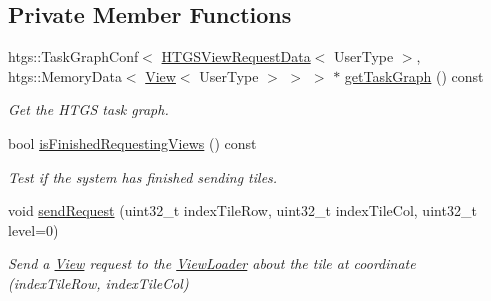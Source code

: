 \subsection*{Private Member Functions}
\begin{DoxyCompactItemize}
\item 
htgs\+::\+Task\+Graph\+Conf$<$ \hyperlink{classfi_1_1HTGSViewRequestData}{H\+T\+G\+S\+View\+Request\+Data}$<$ User\+Type $>$, htgs\+::\+Memory\+Data$<$ \hyperlink{classfi_1_1View}{View}$<$ User\+Type $>$ $>$ $>$ $\ast$ \hyperlink{classfi_1_1FastImage_a81ec16682f029e8d7f64888c6212066b}{get\+Task\+Graph} () const
\begin{DoxyCompactList}\small\item\em Get the H\+T\+GS task graph. \end{DoxyCompactList}\item 
bool \hyperlink{classfi_1_1FastImage_a9a9ebae36096801272a6a8bf8260ef05}{is\+Finished\+Requesting\+Views} () const
\begin{DoxyCompactList}\small\item\em Test if the system has finished sending tiles. \end{DoxyCompactList}\item 
void \hyperlink{classfi_1_1FastImage_a40fb0f9749893a6e04548ee778ee5c1a}{send\+Request} (uint32\+\_\+t index\+Tile\+Row, uint32\+\_\+t index\+Tile\+Col, uint32\+\_\+t level=0)
\begin{DoxyCompactList}\small\item\em Send a \hyperlink{classfi_1_1View}{View} request to the \hyperlink{classfi_1_1ViewLoader}{View\+Loader} about the tile at coordinate (index\+Tile\+Row, index\+Tile\+Col) \end{DoxyCompactList}\end{DoxyCompactItemize}
